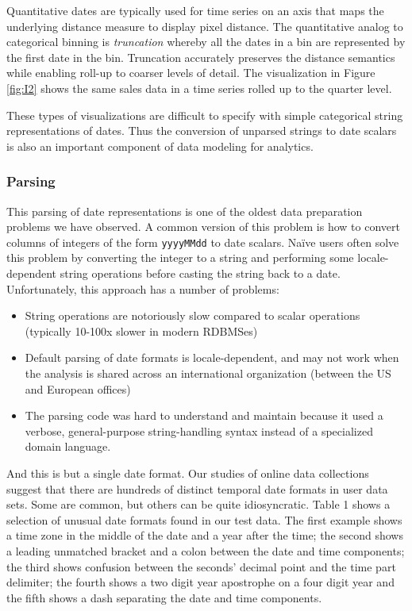Quantitative dates are typically used for time series on an axis that maps the underlying distance measure to display pixel distance. The quantitative analog to categorical binning is \textit{truncation} whereby all the dates in a bin are represented by the first date in the bin. Truncation accurately preserves the distance semantics while enabling roll-up to coarser levels of detail. The visualization in Figure \ref{fig:I2} shows the same sales data in a time series rolled up to the quarter level.

These types of visualizations are difficult to specify with simple categorical string representations of dates. Thus the conversion of unparsed strings to date scalars is also an important component of data modeling for analytics.


\subsubsection{Parsing}
This parsing of date representations is one of the oldest data preparation problems we have observed. A common version of this problem is how to convert columns of integers of the form \texttt{yyyyMMdd} to date scalars. Na\"{i}ve users often solve this problem by converting the integer to a string and performing some locale-dependent string operations before casting the string back to a date. Unfortunately, this approach has a number of problems:
\begin{itemize}
\item String operations are notoriously slow compared to scalar operations (typically 10-100x slower in modern RDBMSes)
\item Default parsing of date formats is locale-dependent, and may not work when the analysis is shared across an international organization (\eg between the US and European offices)
\item The parsing code was hard to understand and maintain because it used a verbose, general-purpose string-handling syntax instead of a specialized domain language.
\end{itemize}

And this is but a single date format. Our studies of online data collections suggest that there are hundreds of distinct temporal date formats in user data sets. Some are common, but others can be quite idiosyncratic. Table 1 shows a selection of unusual date formats found in our test data. The first example shows a time zone in the middle of the date and a year after the time; the second shows a leading unmatched bracket and a colon between the date and time components; the third shows confusion between the seconds' decimal point and the time part delimiter; the fourth shows a two digit year apostrophe on a four digit year and the fifth shows a dash separating the date and time components.



